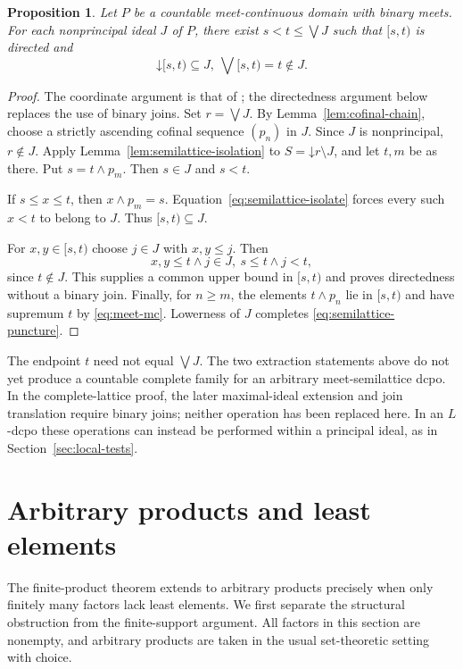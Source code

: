 \documentclass[11pt,reqno]{amsart}
\newtheorem{proposition}[theorem]{Proposition}
\theoremstyle{definition}
\theoremstyle{remark}
\numberwithin{equation}{section}
\newcommand{\down}[1]{\mathord{\downarrow}#1}
\newcommand{\mc}{\wedge}
\begin{document}
\begin{proposition}\label{prop:semilattice-puncture}
Let $P$ be a countable meet-continuous domain with binary meets. For each nonprincipal ideal $J$ of $P$, there exist $s<t\le\bigvee J$ such that $[s,t)$ is directed and
\begin{equation}\label{eq:semilattice-puncture}
 \down[s,t)\subseteq J,~ \bigvee[s,t)=t\notin J.
\end{equation}
\end{proposition}
\begin{proof}
The coordinate argument is that of \cite[Lemma~3.2]{XuJi}; the directedness argument below replaces the use of binary joins. Set $r=\bigvee J$. By Lemma~\ref{lem:cofinal-chain}, choose a strictly ascending cofinal sequence $(p_n)$ in $J$. Since $J$ is nonprincipal, $r\notin J$. Apply Lemma~\ref{lem:semilattice-isolation} to $S=\down r\setminus J$, and let $t,m$ be as there. Put $s=t\mc p_m$. Then $s\in J$ and $s<t$.

If $s\le x\le t$, then $x\mc p_m=s$. Equation~\eqref{eq:semilattice-isolate} forces every such $x<t$ to belong to $J$. Thus $[s,t)\subseteq J$.

For $x,y\in[s,t)$ choose $j\in J$ with $x,y\le j$. Then
\[
 x,y\le t\mc j\in J,~ s\le t\mc j<t,
\]
since $t\notin J$. This supplies a common upper bound in $[s,t)$ and proves directedness without a binary join. Finally, for $n\ge m$, the elements $t\mc p_n$ lie in $[s,t)$ and have supremum $t$ by \eqref{eq:meet-mc}. Lowerness of $J$ completes \eqref{eq:semilattice-puncture}.
\end{proof}

The endpoint $t$ need not equal $\bigvee J$. The two extraction statements above do not yet produce a countable complete family for an arbitrary meet-semilattice dcpo. In the complete-lattice proof, the later maximal-ideal extension and join translation require binary joins; neither operation has been replaced here. In an $L$-dcpo these operations can instead be performed within a principal ideal, as in Section~\ref{sec:local-tests}.

\section{Arbitrary products and least elements}\label{sec:arbitrary-products}
The finite-product theorem extends to arbitrary products precisely when only finitely many factors lack least elements. We first separate the structural obstruction from the finite-support argument. All factors in this section are nonempty, and arbitrary products are taken in the usual set-theoretic setting with choice.
\end{document}
